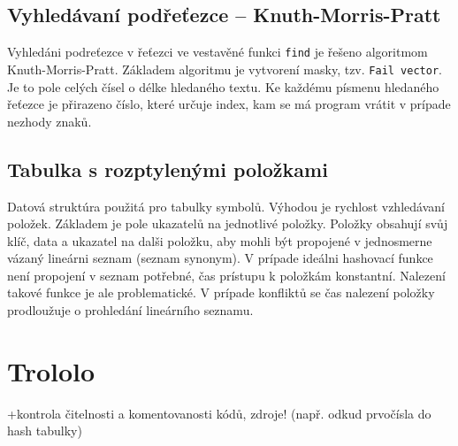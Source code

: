 \documentclass[a4paper, 12pt]{article}
\begin{document}
\subsection{Vyhledávaní podřeťezce -- Knuth-Morris-Pratt}
Vyhledáni podreťezce v řeťezci ve vestavěné funkci \texttt{find} je řešeno
algoritmom Knuth-Morris-Pratt. Základem algoritmu je vytvorení masky, tzv.
\texttt{Fail vector}. Je to pole celých čísel o délke hledaného textu. Ke
každému písmenu hledaného řeťezce je přirazeno číslo, které určuje index, kam
se má program vrátit v prípade nezhody znaků.

\subsection{Tabulka s rozptylenými položkami}
Datová struktúra použitá pro tabulky symbolů. Výhodou je rychlost vzhledávaní
položek. Základem je pole ukazatelů na
jednotlivé položky. Položky obsahují svůj klíč, data a ukazatel na dalši
položku, aby mohli být propojené v jednosmerne vázaný lineárni
seznam (seznam synonym). V prípade ideálni hashovací funkce není propojení v
seznam potřebné, čas prístupu k položkám konstantní. Nalezení takové
funkce je ale problematické. V prípade konfliktů se čas nalezení položky
prodloužuje o prohledání lineárního seznamu.




\section{Trololo} \label{trololo}
+kontrola čitelnosti a komentovanosti kódů, zdroje! (např. odkud prvočísla do hash tabulky)
\end{document}
